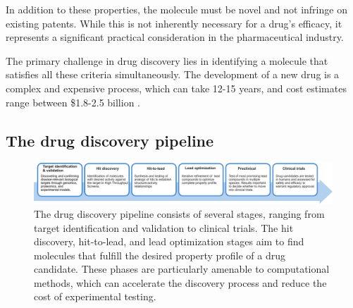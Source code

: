 In addition to these properties, the molecule must be novel and not infringe on existing patents.
While this is not inherently necessary for a drug's efficacy, it represents a significant practical
consideration in the pharmaceutical industry.

The primary challenge in drug discovery lies in identifying a molecule that satisfies all these
criteria simultaneously. The development of a new drug is a complex and expensive process, which can
take 12-15 years, and cost estimates range between \$1.8-2.5 billion \citep{hughesPrinciplesEarlyDrug2011,paulHowImproveProductivity2010,dimasiInnovationPharmaceuticalIndustry2016}.

\subsection{The drug discovery pipeline}
\begin{figure}
	\centering
	\includegraphics[width=\textwidth]{figures/drug-discovery-pipeline_v2.pdf}
	\caption{The drug discovery pipeline consists of several stages, ranging from target
		identification and validation to clinical trials. The hit discovery, hit-to-lead, and lead
		optimization stages aim to find molecules that fulfill the desired property profile of a
		drug candidate. These phases are particularly amenable to computational methods, which can
		accelerate the discovery process and reduce the cost of experimental
		testing.\label{fig:drug-discovery-pipeline}}
\end{figure}

